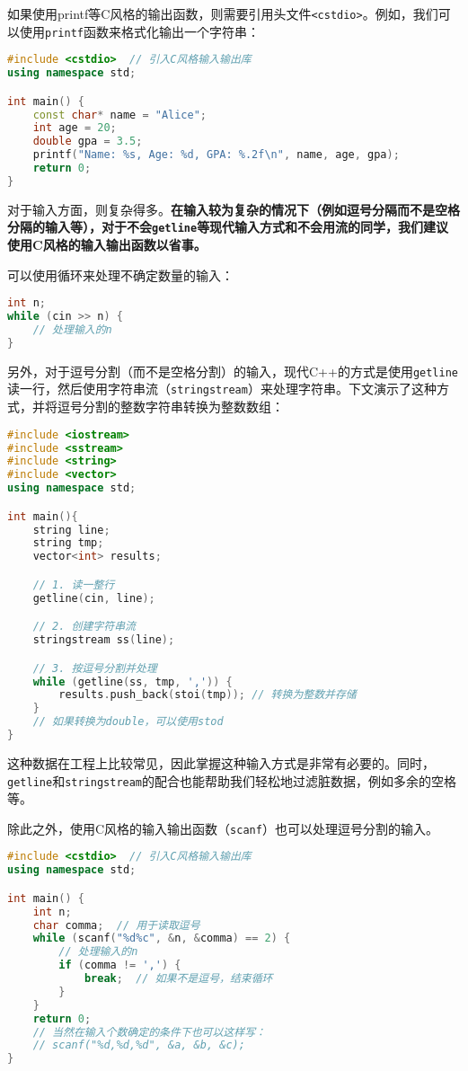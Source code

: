 如果使用{printf}等C风格的输出函数，则需要引用头文件\texttt{<cstdio>}。例如，我们可以使用\texttt{printf}函数来格式化输出一个字符串：
\begin{lstlisting}[language=C++]
#include <cstdio>  // 引入C风格输入输出库
using namespace std;

int main() {
    const char* name = "Alice";
    int age = 20;
    double gpa = 3.5;
    printf("Name: %s, Age: %d, GPA: %.2f\n", name, age, gpa);
    return 0;
}
\end{lstlisting}

对于输入方面，则复杂得多。{\color{red}\textbf{在输入较为复杂的情况下（例如逗号分隔而不是空格分隔的输入等），对于不会\texttt{getline}等现代输入方式和不会用流的同学，我们建议使用C风格的输入输出函数以省事。}}

可以使用循环来处理不确定数量的输入：
\begin{lstlisting}[language=C++]
int n;
while (cin >> n) {
    // 处理输入的n
}
\end{lstlisting}

另外，对于逗号分割（而不是空格分割）的输入，现代C++的方式是使用\texttt{getline}读一行，然后使用字符串流（\texttt{stringstream}）来处理字符串。下文演示了这种方式，并将逗号分割的整数字符串转换为整数数组：
\begin{lstlisting}[language=C++]
#include <iostream>
#include <sstream>
#include <string>
#include <vector>
using namespace std;

int main(){
    string line;
    string tmp;
    vector<int> results;

    // 1. 读一整行
    getline(cin, line);

    // 2. 创建字符串流
    stringstream ss(line);

    // 3. 按逗号分割并处理
    while (getline(ss, tmp, ',')) {
        results.push_back(stoi(tmp)); // 转换为整数并存储
    }
    // 如果转换为double，可以使用stod
}
\end{lstlisting}
这种数据在工程上比较常见，因此掌握这种输入方式是非常有必要的。同时，\texttt{getline}和\texttt{stringstream}的配合也能帮助我们轻松地过滤脏数据，例如多余的空格等。

除此之外，使用C风格的输入输出函数（\texttt{scanf}）也可以处理逗号分割的输入。
\begin{lstlisting}[language=C++]
#include <cstdio>  // 引入C风格输入输出库
using namespace std;

int main() {
    int n;
    char comma;  // 用于读取逗号
    while (scanf("%d%c", &n, &comma) == 2) {
        // 处理输入的n
        if (comma != ',') {
            break;  // 如果不是逗号，结束循环
        }
    }
    return 0;
    // 当然在输入个数确定的条件下也可以这样写：
    // scanf("%d,%d,%d", &a, &b, &c);
}
\end{lstlisting}

